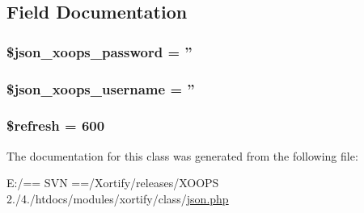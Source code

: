 \subsection{Field Documentation}
\hypertarget{class_j_s_o_n_xortify_exchange_a7af311f07c1c09254920e6ac0cefe9a9}{
\subsubsection[{\$json\-\_\-xoops\-\_\-password}]{\setlength{\rightskip}{0pt plus 5cm}\$json\-\_\-xoops\-\_\-password = ''}}\label{class_j_s_o_n_xortify_exchange_a7af311f07c1c09254920e6ac0cefe9a9}
\hypertarget{class_j_s_o_n_xortify_exchange_ac058687d82a56fb93513e7e58c4ec391}{
\subsubsection[{\$json\-\_\-xoops\-\_\-username}]{\setlength{\rightskip}{0pt plus 5cm}\$json\-\_\-xoops\-\_\-username = ''}}\label{class_j_s_o_n_xortify_exchange_ac058687d82a56fb93513e7e58c4ec391}
\hypertarget{class_j_s_o_n_xortify_exchange_a8527f826b6959aaa92b0e51ee427ba1a}{
\subsubsection[{\$refresh}]{\setlength{\rightskip}{0pt plus 5cm}\$refresh = 600}}\label{class_j_s_o_n_xortify_exchange_a8527f826b6959aaa92b0e51ee427ba1a}


The documentation for this class was generated from the following file\-:\begin{DoxyCompactItemize}
\item 
E\-:/== S\-V\-N ==/\-Xortify/releases/\-X\-O\-O\-P\-S 2./4./htdocs/modules/xortify/class/\hyperlink{class_2json_8php}{json.\-php}\end{DoxyCompactItemize}
